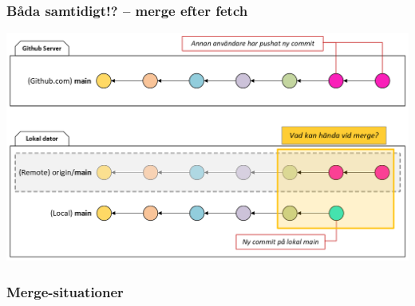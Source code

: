 \begin{frame}
    \frametitle{Båda samtidigt!? -- merge efter fetch}

    \begin{center}
        \includegraphics[width=\textwidth]{figs/local_remote_fetch_merge_conflict.png}
    \end{center}

\end{frame}


\begin{frame}
    \frametitle{Merge-situationer}

    \begin{itemize}
    \end{itemize}

\end{frame}

